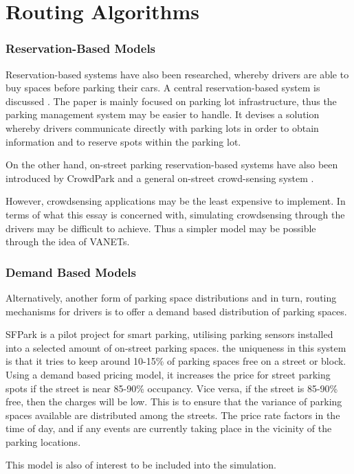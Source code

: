 \section{Routing Algorithms}
\subsubsection{Reservation-Based Models}
Reservation-based systems have also been researched, whereby drivers are able to buy spaces before parking their cars. A central reservation-based system is discussed \cite{2}. The paper is mainly focused on parking lot infrastructure, thus the parking management system may be easier to handle. It devises a solution whereby drivers communicate directly with parking lots in order to obtain information and to reserve spots within the parking lot.

On the other hand, on-street parking reservation-based systems have also been introduced by CrowdPark \cite{8} and a general on-street crowd-sensing system \cite{9}.

However, crowdsensing applications may be the least expensive to implement. In terms of what this essay is concerned with, simulating crowdsensing through the drivers may be difficult to achieve. Thus a simpler model may be possible through the idea of VANETs.

\subsubsection{Demand Based Models}
Alternatively, another form of parking space distributions and in turn, routing mechanisms for drivers is to offer a demand based distribution of parking spaces.

SFPark \cite{12} is a pilot project for smart parking, utilising parking sensors installed into a selected amount of on-street parking spaces. the uniqueness in this system is that it tries to keep around 10-15\% of parking spaces free on a street or block. Using a demand based pricing model, it increases the price for street parking spots if the street is near 85-90\% occupancy. Vice versa, if the street is 85-90\% free, then the charges will be low. This is to ensure that the variance of parking spaces available are distributed among the streets. The price rate factors in the time of day, and if any events are currently taking place in the vicinity of the parking locations.

This model is also of interest to be included into the simulation.